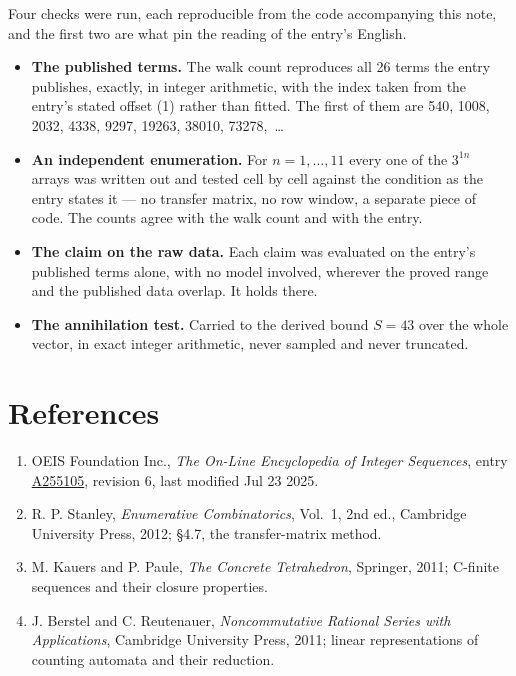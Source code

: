 \documentclass[11pt]{article}
\theoremstyle{definition}
\begin{document}
Four checks were run, each reproducible from the code accompanying this note, and the first two are what pin the reading of the entry's English.

\begin{itemize}

\item {\bfseries The published terms.} The walk count reproduces all 26 terms the entry publishes, exactly, in integer arithmetic, with the index taken from the entry's stated offset (1) rather than fitted. The first of them are 540, 1008, 2032, 4338, 9297, 19263, 38010, 73278,~\dots

\item {\bfseries An independent enumeration.} For $n = 1,\dots,11$ every one of the $3^{1n}$ arrays was written out and tested cell by cell against the condition as the entry states it --- no transfer matrix, no row window, a separate piece of code. The counts agree with the walk count and with the entry.

\item {\bfseries The claim on the raw data.} Each claim was evaluated on the entry's published terms alone, with no model involved, wherever the proved range and the published data overlap. It holds there.

\item {\bfseries The annihilation test.} Carried to the derived bound $S = 43$ over the whole vector, in exact integer arithmetic, never sampled and never truncated.

\end{itemize}

\section{References}

\begin{enumerate}

\item OEIS Foundation Inc., \emph{The On-Line Encyclopedia of Integer Sequences}, entry \href{https://oeis.org/A255105}{A255105}, revision 6, last modified Jul 23 2025.

\item R. P. Stanley, \emph{Enumerative Combinatorics}, Vol.~1, 2nd ed., Cambridge University Press, 2012; \S4.7, the transfer-matrix method.

\item M. Kauers and P. Paule, \emph{The Concrete Tetrahedron}, Springer, 2011; C-finite sequences and their closure properties.

\item J. Berstel and C. Reutenauer, \emph{Noncommutative Rational Series with Applications}, Cambridge University Press, 2011; linear representations of counting automata and their reduction.

\end{enumerate}
\end{document}
